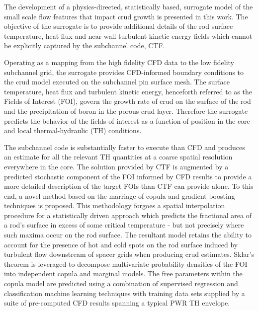 
\utabstract
{}%
\indent
The development of a physics-directed, statistically based,
surrogate model of the small scale flow features that impact crud growth is presented in this work. 
The objective of the surrogate is to provide additional details of the rod surface temperature, heat
flux and near-wall turbulent kinetic energy fields which cannot be explicitly captured by the subchannel code, CTF. 

Operating as a mapping from the high fidelity CFD data to the low fidelity subchannel grid, the surrogate provides CFD-informed boundary conditions to the crud model executed on the subchannel pin surface mesh. The surface temperature, heat
flux and turbulent kinetic energy, henceforth referred to as the Fields of Interest (FOI),
govern the growth rate of crud on the surface of the rod and the
precipitation of boron in the porous crud layer. Therefore the surrogate predicts the behavior of the
fields of interest as a function of position in the core and local thermal-hydraulic (TH) conditions.

The subchannel code is substantially faster to execute than CFD
and produces an estimate for all the relevant TH quantities at a coarse spatial resolution everywhere in
the core.  The solution provided by CTF is augmented by a predicted stochastic
component of the FOI informed by CFD results to provide a more detailed description of the target
FOIs than CTF can provide alone.  To this end, a novel method based on the marriage of copula and
gradient boosting techniques is proposed. This methodology forgoes a spatial interpolation procedure
for a statistically driven approach which predicts the fractional area of a rod’s surface in excess of some
critical temperature - but not precisely where such maxima occur on the rod surface.
The resultant model retains the ability to account for the presence
of hot and cold spots on the rod surface induced by turbulent flow downstream of spacer grids when
producing crud estimates. Sklar’s theorem is leveraged to decompose multivariate probability densities
of the FOI into independent copula and marginal models. The free parameters within the copula model
are predicted using a combination of supervised regression and classification machine learning techniques
with training data sets supplied by a suite of pre-computed CFD results spanning a typical PWR TH
envelope.
